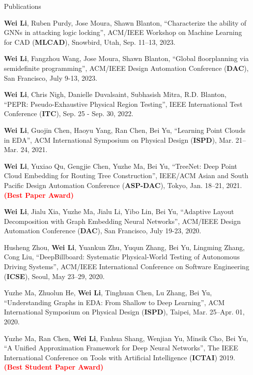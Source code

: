 \begin{rSection}{Publications}
\begin{description}[font=\normalfont]
\item[{[C12]}]{
    \textbf{Wei Li}, Ruben Purdy, Jose Moura, Shawn Blanton, 
    ``Characterize the ability of GNNs in attacking logic locking'', ACM/IEEE Workshop on Machine Learning for CAD (\textbf{MLCAD}), Snowbird, Utah, Sep. 11–13, 2023. 
}
    \item[{[C11]}]{
        \textbf{Wei Li},  Fangzhou Wang, Jose Moura, Shawn Blanton, 
        ``Global floorplanning via semidefinite programming'', ACM/IEEE Design Automation Conference (\textbf{DAC}), San Francisco, July 9-13, 2023.
    }
\item[{[C10]}]{
    \textbf{Wei Li}, Chris Nigh, Danielle Duvalsaint, Subhasish Mitra, R.D. Blanton, 
    ``PEPR: Pseudo-Exhaustive Physical Region Testing'', IEEE International Test Conference (\textbf{ITC}), Sep. 25 - Sep. 30, 2022.
}
\item[{[C9]}]{
    \textbf{Wei Li}, Guojin Chen, Haoyu Yang, Ran Chen, Bei Yu,
    ``Learning Point Clouds in EDA'', 
    ACM International Symposium on Physical Design (\textbf{ISPD}), Mar. 21–Mar. 24, 2021.
}
\item[{[C8]}]{
    \textbf{Wei Li}, Yuxiao Qu, Gengjie Chen, Yuzhe Ma, Bei Yu,
    ``TreeNet: Deep Point Cloud Embedding for Routing Tree Construction'', 
    IEEE/ACM Asian and South Pacific Design Automation Conference (\textbf{ASP-DAC}), Tokyo, Jan. 18–21, 2021. \textcolor{red}{\textbf{(Best Paper Award)}}
}
\item[{[C7]}]{
    \textbf{Wei Li}, Jialu Xia, Yuzhe Ma, Jialu Li, Yibo Lin, Bei Yu, 
    ``Adaptive Layout Decomposition with Graph Embedding Neural Networks'', 
    ACM/IEEE Design Automation Conference (\textbf{DAC}), San Francisco, July 19-23, 2020.
}
\item[{[C6]}]{
    Husheng Zhou, \textbf{Wei Li}, Yuankun Zhu, Yuqun Zhang, Bei Yu, Lingming Zhang, Cong Liu, 
    ``DeepBillboard: Systematic Physical-World Testing of Autonomous Driving Systems'', ACM/IEEE International Conference on Software Engineering (\textbf{ICSE}), Seoul, May 23–29, 2020.
}
\item[{[C5]}]{
    Yuzhe Ma, Zhuolun He, \textbf{Wei Li}, Tinghuan Chen, Lu Zhang, Bei Yu, 
    ``Understanding Graphs in EDA: From Shallow to Deep Learning'', ACM International Symposium on Physical Design (\textbf{ISPD}), Taipei, Mar. 25–Apr. 01, 2020.
}
\item[{[C4]}]{
    Yuzhe Ma, Ran Chen, \textbf{Wei Li}, Fanhua Shang, Wenjian Yu, Minsik Cho, Bei Yu, 
    ``A Unified Approximation Framework for Deep Neural Networks'', The IEEE International Conference on Tools with Artificial Intelligence (\textbf{ICTAI}) 2019. \textcolor{red}{\textbf{(Best Student Paper Award)}}
}
\end{description}
\end{rSection}

